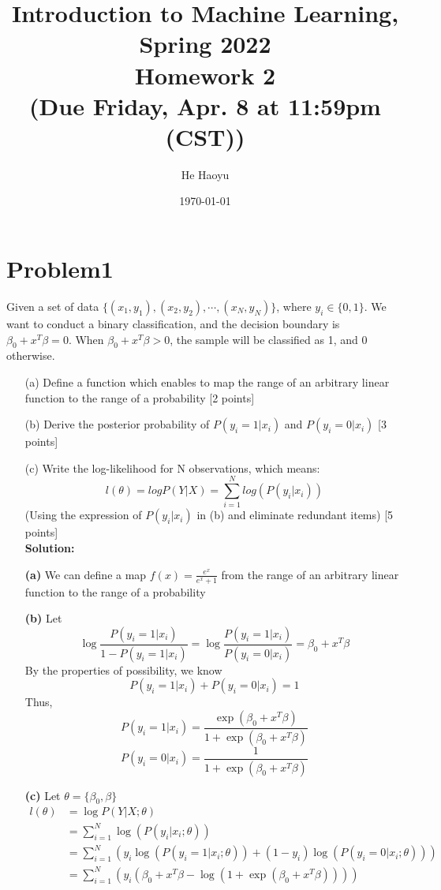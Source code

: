\documentclass[10pt]{article}
\author{He Haoyu}
\begin{document}
\date{\today}
\title{Introduction to Machine Learning, Spring 2022 \\
Homework 2\\
\small (Due Friday, Apr. 8 at 11:59pm (CST))}
\maketitle


\section{Problem1}
Given a set of data $\{(x_1, y_1), (x_2, y_2), \cdots, (x_N, y_N)\}$, where $y_i \in \{0, 1\}$. We want to conduct a binary classification, and the decision boundary is $\beta_0 + x^T\beta = 0$. When $\beta_0 + x^T\beta > 0$, the sample will be classified as 1, and 0 otherwise. 

\begin{enumerate}

\item[(a)]
Define a function which enables to map the range of an arbitrary linear function to the range of a probability {\color{red} [2 points]}\\

\item[(b)]
Derive the posterior probability of $P(y_i=1 | x_i)$ and $P(y_i=0 | x_i)$ {\color{red} [3 points]}\\

\item[(c)]
Write the log-likelihood for N observations, which means:
$$l(\theta) = logP(Y|X) = \sum_{i=1}^Nlog(P(y_i|x_i))$$
(Using the expression of $P(y_i|x_i)$ in (b) and eliminate redundant items) {\color{red} [5 points]}\\
\textbf{Solution:}

  \item[\textbf{(a)}]
      We can define  a map $f(x)=\frac{e^x}{e^x+1}$ from the range of an arbitrary linear function to the range of a probability
	\item[\textbf{(b)}] 
      Let $$\log \frac{P(y_i=1|x_i)}{1 - P(y_i=1|x_i)} = \log \frac{P(y_i=1|x_i)}{P(y_i=0|x_i)} =\beta_0 +x^T \beta$$
      By the properties of possibility, we know $$P(y_i=1|x_i)+P(y_i=0|x_i) = 1$$
      Thus,$$P(y_i=1|x_i) = \frac{\exp (\beta_0+x^T\beta)}{1+\exp (\beta_0+x^T\beta)}$$
      $$P(y_i=0|x_i) = \frac{1}{1+\exp (\beta_0+x^T\beta)}$$
	\item[\textbf{(c)}] 
      Let $\theta  = \{\beta_0,\beta\}$
      $$
      \begin{aligned}
          l(\theta) &= \log P(Y|X;\theta)
          \\&= \sum_{i=1}^N\log (P(y_i|x_i;\theta))
          \\&=\sum_{i=1}^N(y_i\log (P(y_i=1|x_i;\theta))+ (1-y_i)\log (P(y_i=0|x_i;\theta)))
          \\&=\sum_{i=1}^N(y_i(\beta_0+x^T\beta -\log (1+\exp (\beta_0+x^T\beta))))
      \end{aligned}
      $$
\end{enumerate}
\newpage
\end{document}
